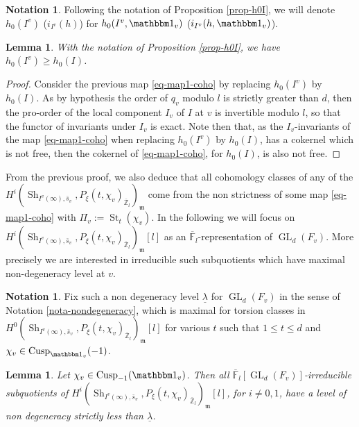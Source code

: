 \documentclass[JEP,XML,SOM,Unicode,published]{cedram}
\let\mathds\mathbbm
\DeclareMathOperator{\GL}{GL}
\theoremstyle{plain}
\newtheorem{lemma}[equation]{Lemma}
\theoremstyle{definition}
\newtheorem{nota}[equation]{Notation}
\numberwithin{equation}{subsection}
\newcommand\Fm{{\mathbb F}}
\newcommand\Zm{{\mathbb Z}}
\DeclareMathOperator{\sh}{Sh}
\DeclareMathOperator{\cusp}{Cusp}
\DeclareMathOperator{\st}{St}
\let \oo=\infty
\begin{document}
\begin{nota} \label{nota-h0I}
Following the notation of Proposition \ref{prop-h0I}, we will
denote $h_0(I^v)$ (\resp $i_{I^v}(h)$) for $h_0(I^v,\mathds 1_v)$
(\resp $i_{I^v}(h,\mathds 1_v)$).
\end{nota}

\begin{lemma} \label{lem-iIv}
With the notation of Proposition \ref{prop-h0I}, we have $h_0(I^v) \geq h_0(I)$.
\end{lemma}

\begin{proof}
Consider the previous map \eqref{eq-map1-coho} by replacing $h_0(I^v)$ by $h_0(I)$.
As by hypothesis the order of $q_v$ modulo $l$ is strictly greater than $d$,
then the
pro-order of the local component $I_v$ of $I$ at $v$
is invertible modulo $l$, so that the functor of invariants under $I_v$ is exact.
Note then that, as the $I_v$-invariants of the map \eqref{eq-map1-coho} when
replacing $h_0(I^v)$ by $h_0(I)$, has a cokernel which is not free, then the cokernel
of \eqref{eq-map1-coho}, for $h_0(I)$, is also not free.
\end{proof}

From the previous proof, we also deduce that all cohomology classes of any of
the $H^i(\sh_{I^{v}(\oo),\bar s_v},P_\xi(t,\chi_v)_{\overline \Zm_l})_{\mathfrak m}$ come
from the non strictness of some map \eqref{eq-map1-coho} with $\Pi_v:=\st_t(\chi_v)$. In the following we will focus
on $H^i(\sh_{I^{v}(\oo),\bar s_v},P_\xi(t,\chi_v)_{\overline \Zm_l})_{\mathfrak m}[l]$ as an $\overline \Fm_l$-representation of $\GL_d(F_v)$.
More precisely we are interested in irreducible such subquotients which have
maximal non-degeneracy level at $v$.

\begin{nota}
Fix such a non degeneracy level $\underline{\lambda}$ for $\GL_d(F_v)$
in the sense of Notation \ref{nota-nondegeneracy}, which is maximal for torsion classes
in $H^0(\sh_{I^{v}(\oo),\bar s_v},P_\xi(t,\chi_v)_{\overline \Zm_l})_{\mathfrak m}[l]$ for various $t$ such that $1 \leq t \leq d$ and $\chi_v \in \cusp_{\mathds 1_v}(-1)$.
\end{nota}

\begin{lemma} \label{lem-rem-after1}
Let $\chi_v \in \cusp_{-1}(\mathds 1_v)$.
Then all $\overline \Fm_l[\GL_d(F_v)]$-irreducible subquotients of
$H^i(\sh_{I^{v}(\oo),\bar s_v},P_\xi(t,\chi_v)_{\overline \Zm_l})_{\mathfrak m}[l]$, for $i\neq 0,1$,
have a level of
non degeneracy strictly less than $\underline{\lambda}$.
\end{lemma}
\end{document}
